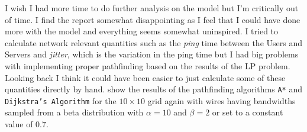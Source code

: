 \documentclass[10pt, titlepage, a4paper]{article}
\begin{document}
I wish I had more time to do further analysis on the model but I'm critically out of time. I find the report somewhat disappointing
as I feel that I could have done more with the model and everything seems somewhat uninspired. I tried to calculate network relevant 
quantities such as the \textit{ping} time between the Users and Servers and \textit{jitter}, which is the variation in the ping time but 
I had big problems with implementing proper pathfinding based on the results of the LP problem. Looking back I think it could have been easier to 
just calculate some of these quantities directly by hand. \textcolor{red}{} show the results of the pathfinding
algorithms \texttt{A*} \cite{astar} and \texttt{Dijkstra's Algorithm} \cite{dijkstra} for the $10\times 10$ grid again with wires having bandwidths sampled from a beta distribution with $\alpha = 10$ and $\beta = 2$
or set to a constant value of $0.7$. 
\end{document}
